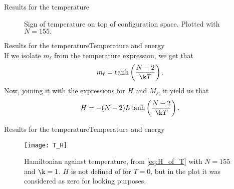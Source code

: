 \begin{frame}{Results for the temperature}
\vspace{-1mm}
\begin{figure}[h]
    \centering
	\vspace{-1mm}
    \caption{Sign of temperature on top of configuration space. Plotted with $N=155.$}
    \label{fig:Tpos-neg}
\end{figure}
\end{frame}



\begin{frame}{Results for the temperature}{Temperature and energy}
	\setlength\fboxrule{0.5pt}
	\setlength\fboxsep{4pt}
\\[1em]

	If we isolate $m_\ell$ from the temperature expression, we get that 	
\begin{equation}
    m_\ell = \tanh \left(\frac{N-2}{\k T}\right).\label{eq:ml_of_T}
\end{equation}
Now, joining it with the expressions for $H$ and $M_\ell$, it yield us that
\begin{align}
    H = -(N-2)L\tanh \left(\frac{N-2}{\k T}\right). \label{eq:H_of_T}
\end{align}
\end{frame}

\begin{frame}{Results for the temperature}{Temperature and energy}
	\begin{figure}[h]
	    \centering
		\texttt{[image: T\_H]}
	    \caption{Hamiltonian against temperature, from \cref{eq:H_of_T} with $N=155$ and $\k=1$. $H$ is not defined of for $T=0$, but in the plot it was considered as zero for looking purposes.}
	    \label{fig:T_H_out}
	\end{figure}    
\end{frame}


